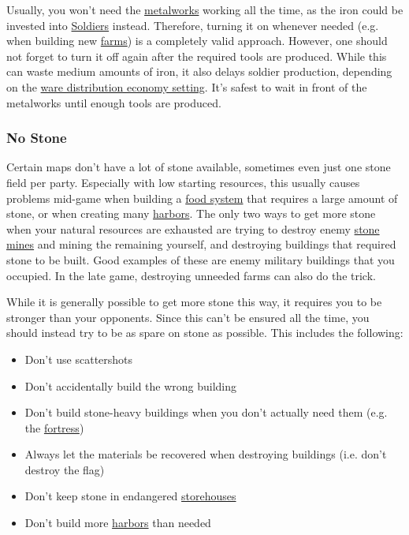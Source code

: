 \documentclass[12pt]{article}
\begin{document}
Usually, you won't need the \hyperref[sec:metalworks]{metalworks} working all the time, as the iron could be invested into \hyperref[sec:soldiers]{Soldiers} instead. Therefore, turning it on whenever needed (e.g. when building new \hyperref[sec:farm]{farms}) is a completely valid approach. However, one should not forget to turn it off again after the required tools are produced. While this can waste medium amounts of iron, it also delays soldier production, depending on the \hyperref[sec:waredistribution]{ware distribution economy setting}. It's safest to wait in front of the metalworks until enough tools are produced.

\subsubsection{No Stone}
\label{sec:nostone}

Certain maps don't have a lot of stone available, sometimes even just one stone field per party. Especially with low starting resources, this usually causes problems mid-game when building a \hyperref[sec:foodsystems]{food system} that requires a large amount of stone, or when creating many \hyperref[sec:harbor]{harbors}. The only two ways to get more stone when your natural resources are exhausted are trying to destroy enemy \hyperref[sec:stonemine]{stone mines} and mining the remaining yourself, and destroying buildings that required stone to be built. Good examples of these are enemy military buildings that you occupied. In the late game, destroying unneeded farms can also do the trick.

While it is generally possible to get more stone this way, it requires you to be stronger than your opponents. Since this can't be ensured all the time, you should instead try to be as spare on stone as possible. This includes the following:

\begin{itemize}
    \item Don't use scattershots
    \item Don't accidentally build the wrong building
    \item Don't build stone-heavy buildings when you don't actually need them (e.g. the \hyperref[sec:fortress]{fortress})
    \item Always let the materials be recovered when destroying buildings (i.e. don't destroy the flag)
    \item Don't keep stone in endangered \hyperref[sec:storehouse]{storehouses}
    \item Don't build more \hyperref[sec:harbor]{harbors} than needed
\end{itemize}
\end{document}
